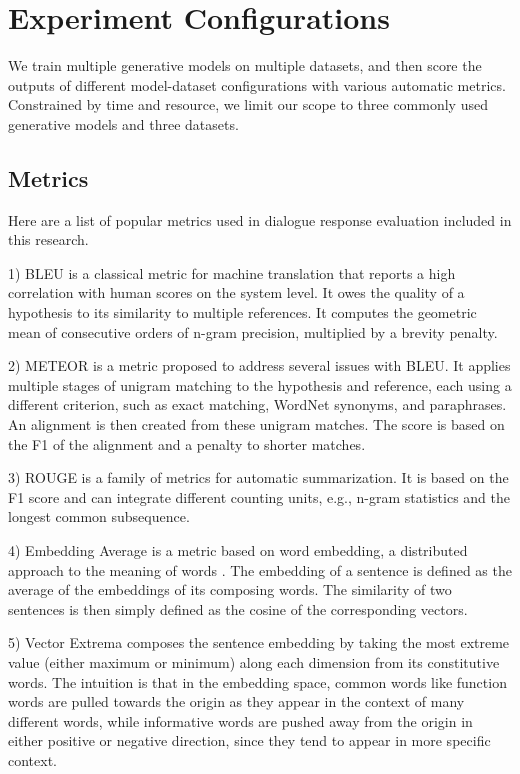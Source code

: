 \documentclass[conference]{IEEEtran}
\begin{document}
\section{Experiment Configurations}
We train multiple generative models on multiple datasets, and then score the outputs of different model-dataset configurations with various automatic metrics.
Constrained by time and resource, we limit our scope to three commonly used generative models and three datasets.

\subsection{Metrics}
Here are a list of popular metrics used in dialogue response evaluation included in this research.

1) BLEU \cite{BLEU} is a classical metric for machine translation that reports a high correlation with human scores on the system level.
It owes the quality of a hypothesis to its similarity to multiple references.
It computes the geometric mean of consecutive orders of n-gram precision, multiplied by a brevity penalty.

2) METEOR \cite{METEOR} is a metric proposed to address several issues with BLEU.
It applies multiple stages of unigram matching to the hypothesis and reference, each using a different criterion, such as exact matching, WordNet synonyms, and paraphrases.
An alignment is then created from these unigram matches.
The score is based on the F1 of the alignment and a penalty to shorter matches.

3) ROUGE \cite{ROUGE} is a family of metrics for automatic summarization.
It is based on the F1 score and can integrate different counting units, e.g., n-gram statistics and the longest common subsequence.

4) Embedding Average is a metric based on word embedding, a distributed approach to the meaning of words \cite{word2vec}.
The embedding of a sentence is defined as the average of the embeddings of its composing words.
The similarity of two sentences is then simply defined as the cosine of the corresponding vectors.

5) Vector Extrema \cite{Vector_Extrema} composes the sentence embedding by taking the most extreme value (either maximum or minimum) along each dimension from its constitutive words.
The intuition is that in the embedding space, common words like function words are pulled towards the origin as they appear in the context of many different words, while informative words are pushed away from the origin in either positive or negative direction, since they tend to appear in more specific context.
\end{document}
